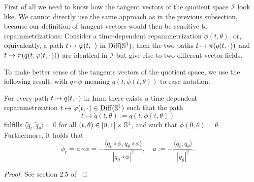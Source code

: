 First of all we need to know how the tangent vectors of the quotient space $\mathcal{I}$ look like. We cannot directly use the same approach as in the previous subsection, because our definition of tangent vectors would then be
sensitive to reparametrizations: Consider a time-dependent
reparametrization $\phi(t,\theta)$, or, equivalently, a path $t \mapsto \phi(t,
\blank)$ in $\text{Diff}(\S^1)$; then the two paths $t \mapsto
\pi(q(t, \blank))$ and $t \mapsto \pi(q(t, \phi(t, \blank)))$ are
identical in $\mathcal{I}$ but give rise to two different vector fields.

To make better sense of the tangents vectors of the quotient space, we
use the following result, with $q \circ \phi$ meaning $q(t,\phi(t,\theta))$ to ease notation.

\begin{proposition}
  \label{prop:horizontal-path}
  For every path $t \mapsto q(t, \blank)$ in $\mathrm{Imm}$ there exists a
  time-dependent reparametrization $t \mapsto \phi(t, \blank) \in
  \mathrm{Diff}(\S^{1})$ such that the path
  \begin{equation*}
    t \mapsto \tilde{q}(t, \theta):=q(t, \phi(t,\theta))
  \end{equation*}
  fulfills
  $\langle \tilde{q}_t, \tilde{q}_{\theta}\rangle=0$ for all $(t,\theta) \in [0,1]\times \S^1$, and such that $\phi(0, \theta)=\theta$. Furthermore, it holds that
  \begin{equation}
    \label{eq:canon-repar}
    \phi_t = a \circ \phi
    = -\frac{\langle q_t \circ \phi, q_{\theta} \circ \phi\rangle}{|q_{\theta}\circ \phi|^2},
    \quad a := -\frac{\langle q_t,
      q_{\theta}\rangle}{|q_{\theta}|^2}.
  \end{equation}
\end{proposition}

\begin{proof}
  See section $2.5$ of \cite{michor2003riemannian} 
\end{proof}

